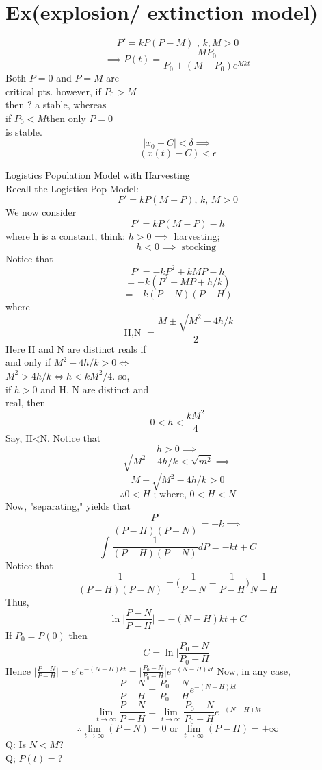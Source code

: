 \section*{Ex(explosion/ extinction model)}
  \[ P' = kP(P-M) \text{ , } k, M>0\]
  \[ \implies P(t) = \frac{MP_0}{P_0 + (M-P_0)e^{Mkt}} \]
  Both \( P=0 \) and \( P=M  \) are \\
  critical pts. however, if \( P_0 > M \) \\
  then ? a stable, whereas \\
  if \( P_0 <M  \)then only \( P=0 \) \\
  is stable.
  \[ |x_0 - C| < \delta  \implies  \]
  \[ (x(t) -C) < \epsilon  \]


  \newpage 
  Logistics Population Model with  Harvesting \\
  Recall the Logistics Pop Model: 
  \[ P' = kP(M-P) \text{, }k \text{, } M>0  \]
  We now consider
  \[ P' = kP(M-P)-h \]
  where h is a constant, think: \( h>0 \implies \) harvesting; \\
  \[ h<0 \implies \text{ stocking } \]
  Notice that 
  \[ P' = -kP^2 + kMP -h \]
  \[ =-k(P^2 -MP + h/k) \]
  \[ = -k(P-N)(P-H) \]
  where
  \[ \text{ H,N  } = \frac{M \pm \sqrt{M^2 -4h/k}}{2} \]
  Here H and N are distinct reals if  \\
  and only if \( M^2 -4h/k > 0 \iff \) \\
  \( M^2 >4h/k \iff h<kM^2/4 \). so,  \\
  if \( h>0 \) and H, N are distinct and  \\
  real, then 
  \[ 0 < h< \frac{kM^2}{4} \]
  Say, H<N. Notice that 
  \[ h>0 \implies \]
  \[ \sqrt{M^2 -4h/k} <  \sqrt{m^2} \implies  \]
  \[ M- \sqrt{M^2 - 4h/k} > 0 \]
  \[ \therefore 0<H \text{ ; where,  } 0< H < N  \]
  Now, "separating,"  yields that 
  \[ \frac{P'}{(P-H)(P-N)} = -k \implies \]
  \[ \int \frac{1}{(P-H)(P-N)}dP = -kt + C  \]
  Notice that 
  \[ \frac{1}{(P-H)(P-N)}= \bigg(\frac{1}{P-N} - \frac{1}{P-H}\bigg) \frac{1}{N-H} \]
  Thus, 
  \[ \ln \bigg| \frac{P-N}{P-H}\bigg| = -(N-H)kt + C \]
  If \( P_0 = P(0)  \) then
  \[  C = \ln \bigg| \frac{P_0-N}{P_0-H}\bigg| \]
  Hence \(  \big| \frac{P-N}{P-H}\big| = e^c e^{-(N-H)kt} = \big| \frac{P_0-N}{P_0-H}\big| e^{-(N-H)kt}\)
  Now, in any case, 
  \[ \frac{P-N}{P-H} =  \frac{P_0-N}{P_0-H} e^{-(N-H)kt}\]
  \[ \lim_{t \to \infty} \frac{P-N}{P-H} = \lim_{t \to \infty} \frac{P_0-N}{P_0-H} e^{-(N-H)kt}	 \]
  \[ \therefore \lim_{t \to \infty}(P-N) =0 \text{ or } \lim_{t \to
  \infty} (P-H) = \pm  \infty  \]
  Q: Is \( N<M \)? \\
  Q; \( P(t) =  \)?

